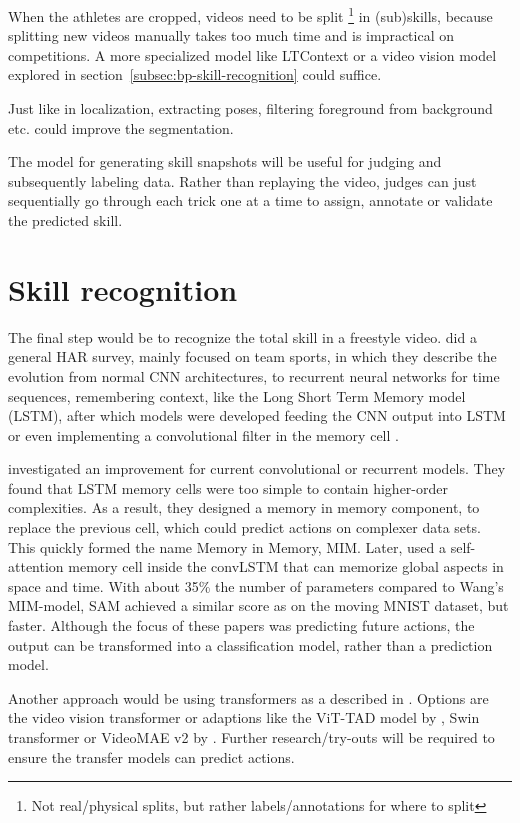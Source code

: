 When the athletes are cropped, videos need to be split \footnote{Not real/physical splits, but rather labels/annotations for where to split} in (sub)skills, because splitting new videos manually takes too much time and is impractical on competitions. A more specialized model like LTContext \autocite{Jiaming_2023} or a video vision model explored in section~\ref{subsec:bp-skill-recognition} could suffice.

Just like in localization, extracting poses, filtering foreground from background etc. could improve the segmentation.

The model for generating skill snapshots will
be useful for judging and subsequently labeling
data. Rather than replaying the video, judges can
just sequentially go through each trick one at a
time to assign, annotate or validate the predicted
skill.




\section{Skill recognition}
\label{lit:skill-recognition}

The final step would be to recognize the total skill in a freestyle video.
\textcite{Yin_2024} did a general HAR survey, mainly focused on team sports, in which they describe the evolution from normal CNN architectures, to recurrent neural networks for time sequences, remembering context, like the Long Short Term Memory model (LSTM), after which models were developed feeding the CNN output into LSTM or even implementing a convolutional filter in the memory cell \autocite{Shi_2015}.

\textcite{Wang_2019} investigated an improvement for current convolutional or recurrent models. They found that LSTM memory cells were too simple to contain higher-order complexities. As a result, they designed a memory in memory component, to replace the previous cell, which could predict actions on complexer data sets. This quickly formed the name Memory in Memory, MIM. Later, \textcite{Lin_2020} used a self-attention memory cell inside the convLSTM that can memorize global aspects in space and time. With about 35\% the number of parameters compared to Wang's MIM-model, SAM achieved a similar score as on the moving MNIST dataset, but faster. Although the focus of these papers was predicting future actions, the output can be transformed into a classification model, rather than a prediction model.

Another approach would be using transformers as a described  in \textcite{Yin_2024}. Options are the video vision transformer \autocite{Arnab2021} or adaptions like the ViT-TAD model by \textcite{Yang_2023}, Swin transformer \textcite{Liu_2021} or VideoMAE v2 by \textcite{Wang_2023}. Further research/try-outs will be required to ensure the transfer models can predict actions.


